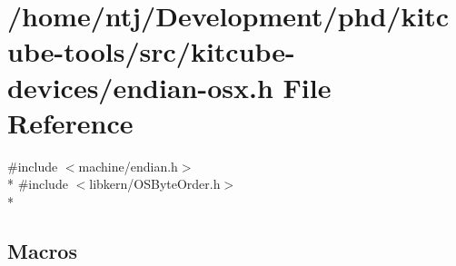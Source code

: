 \hypertarget{endian-osx_8h}{\section{/home/ntj/\-Development/phd/kitcube-\/tools/src/kitcube-\/devices/endian-\/osx.h File Reference}
\label{endian-osx_8h}
}
{\ttfamily \#include $<$machine/endian.\-h$>$}\\*
{\ttfamily \#include $<$libkern/\-O\-S\-Byte\-Order.\-h$>$}\\*
\subsection*{Macros}
